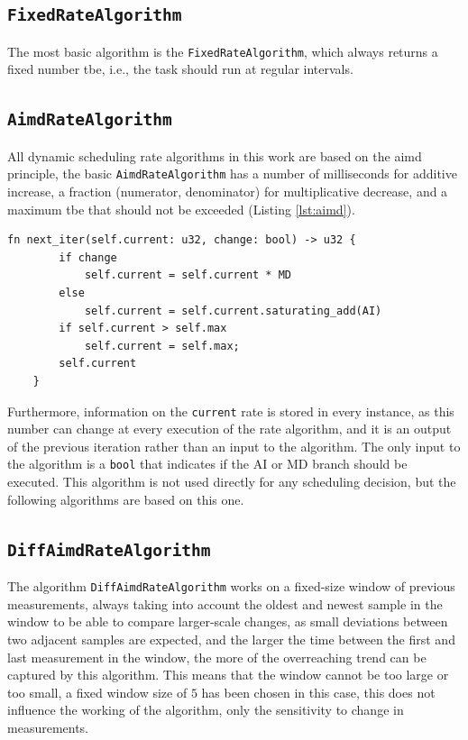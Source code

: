 \subsection{\lstinline{FixedRateAlgorithm}}
The most basic algorithm is the \lstinline{FixedRateAlgorithm}, which always returns a fixed number \gls{tbe}, i.e., the task should run at regular intervals.

\subsection{\lstinline{AimdRateAlgorithm}}\label{subsection:aimd}
All dynamic scheduling rate algorithms in this work are based on the \gls{aimd} principle, the basic \lstinline{AimdRateAlgorithm} has a number of milliseconds for additive increase, a fraction (numerator, denominator) for multiplicative decrease, and a maximum \gls{tbe} that should not be exceeded (Listing \ref{lst:aimd}).

\begin{lstlisting}[caption={AIMD algorithm}, label={lst:aimd}]
    fn next_iter(self.current: u32, change: bool) -> u32 {
        if change
            self.current = self.current * MD
        else 
            self.current = self.current.saturating_add(AI)
        if self.current > self.max
            self.current = self.max;
        self.current
    }
\end{lstlisting}

Furthermore, information on the \lstinline{current} rate is stored in every instance, as this number can change at every execution of the rate algorithm, and it is an output of the previous iteration rather than an input to the algorithm. 
The only input to the algorithm is a \lstinline{bool} that indicates if the AI or MD branch should be executed.
This algorithm is not used directly for any scheduling decision, but the following algorithms are based on this one.

\subsection{\lstinline{DiffAimdRateAlgorithm}}
The algorithm \lstinline{DiffAimdRateAlgorithm} works on a fixed-size window of previous measurements, always taking into account the oldest and newest sample in the window to be able to compare larger-scale changes, as small deviations between two adjacent samples are expected, and the larger the time between the first and last measurement in the window, the more of the overreaching trend can be captured by this algorithm. 
This means that the window cannot be too large or too small, a fixed window size of $5$ has been chosen in this case, this does not influence the working of the algorithm, only the sensitivity to change in measurements.

